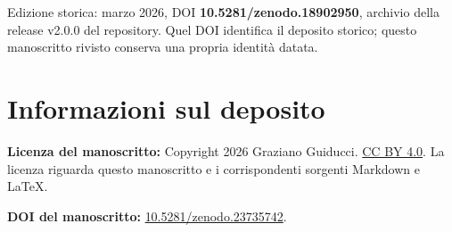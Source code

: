 \documentclass[10pt,a4paper]{article}
\begin{document}
Edizione storica: marzo 2026, DOI \textbf{10.5281/zenodo.18902950}, archivio della release v2.0.0 del repository. Quel DOI identifica il deposito storico; questo manoscritto rivisto conserva una propria identità datata.
\par

\section*{Informazioni sul deposito}

\textbf{Licenza del manoscritto:} Copyright 2026 Graziano Guiducci. \href{https://creativecommons.org/licenses/by/4.0/}{CC BY 4.0}. La licenza riguarda questo manoscritto e i corrispondenti sorgenti Markdown e LaTeX.
\par

\textbf{DOI del manoscritto:} \href{https://doi.org/10.5281/zenodo.23735742}{10.5281/zenodo.23735742}.
\par
\end{document}
